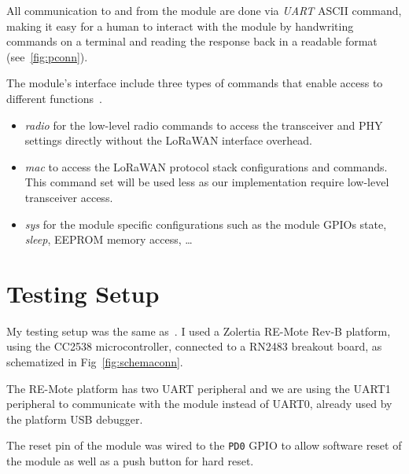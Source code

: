 All communication to and from the module are done via \emph{UART} ASCII command,
making it easy for a human to interact with the module by handwriting commands
on a terminal and reading the response back in a readable format
(see~\ref{fig:pconn}).



The module's interface include three types of commands that enable access to
different functions~\cite{microchip:reference}.

\begin{itemize}
  \item \emph{radio} for the low-level radio commands to access the transceiver
    and PHY settings directly without the LoRaWAN interface overhead.
  \item \emph{mac} to access the LoRaWAN protocol stack configurations and
    commands. This command set will be used less as our implementation require 
    low-level transceiver access.
  \item \emph{sys} for the module specific configurations such as the module
    GPIOs state, \emph{sleep}, EEPROM memory access, \ldots
\end{itemize}

\section{Testing Setup}

My testing setup was the same as~\cite{8847137}. I used a Zolertia RE-Mote
Rev-B platform, using the CC2538 microcontroller, connected to a
RN2483 breakout board, as schematized in Fig~\ref{fig:schemaconn}. 

The RE-Mote platform has two UART peripheral and we are using the UART1 peripheral 
to communicate with the module instead of UART0, already used by the platform USB 
debugger.

The reset pin of the module was wired to the \lstinline{PD0} GPIO to allow
software reset of the module as well as a push button for hard reset.

